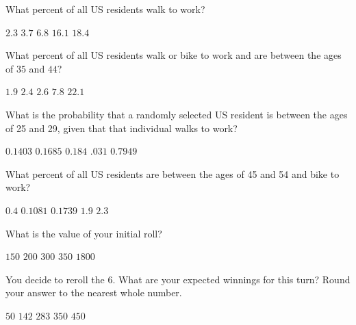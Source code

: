 \documentclass[answers,12pt]{exam}
\begin{document}
\begin{questions}
\question\label{FirstWalk}
What percent of all US residents walk to work?\\
\begin{oneparchoices}
\choice $2.3$ %
\choice $3.7$ %
\choice $6.8$ %
\choice $16.1$ %
\correctchoice $18.4$
\end{oneparchoices}

\question
What percent of all US residents walk or bike to work
and are between the ages of $35$ and $44$?\\
\begin{oneparchoices}
\choice $1.9$ %
\correctchoice $2.4$
\choice $2.6$ %
\choice $7.8$ %
\choice $22.1$ %
\end{oneparchoices}

\question
What is the probability that a randomly selected US resident
is between the ages of 25 and 29, given that that individual
walks to work?\\
\begin{oneparchoices}
\choice $0.1403$ %
\correctchoice $0.1685$
\choice $0.184$ %
\choice $.031$ %
\choice $0.7949$ %
\end{oneparchoices}

\question\label{LastWalk}
What percent of all US residents are between the ages
of 45 and 54 and bike to work?\\
\begin{oneparchoices}
\correctchoice $0.4$
\choice $0.1081$ %
\choice $0.1739$ %
\choice $1.9$ %
\choice $2.3$ %
\end{oneparchoices}


\question\label{FirstF}
What is the value of your initial roll?\\
\begin{oneparchoices}
\choice $150$ %
\choice $200$ %
\choice $300$ %
\correctchoice $350$
\choice $1800$ %
\end{oneparchoices}

\question\label{LastF}
You decide to reroll the $6$. What are your expected
winnings for this turn? Round your answer to the nearest whole number.\\
\begin{oneparchoices}
\choice $50$ %
\correctchoice $142$
\choice $283$ %
\choice $350$ %
\choice $450$ %
\end{oneparchoices}


\end{questions}
\end{document}
